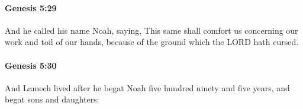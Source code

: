 		\paragraph{Genesis 5:29} %
			\label{GENESIS-5-29}

			And he called his name Noah, saying, This same shall comfort us concerning our work and toil of our hands, because of the ground which the LORD hath cursed.


		\paragraph{Genesis 5:30} %
			\label{GENESIS-5-30}

			And Lamech lived after he begat Noah five hundred ninety and five years, and begat sons and daughters:


